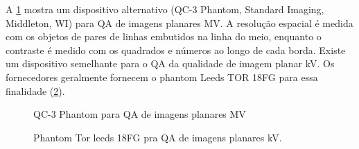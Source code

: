 \documentclass[11pt,a4paper]{article}
\begin{document}
    A \ref{fig:qaImagemPlanarMV} mostra um dispositivo alternativo (QC-3 Phantom, Standard Imaging, Middleton, WI) para QA de imagens planares MV. A resolução espacial é medida com os objetos de pares de linhas embutidos na linha do meio, enquanto o contraste é medido com os quadrados e números ao longo de cada borda. Existe um dispositivo semelhante para o QA da qualidade de imagem planar kV. Os fornecedores geralmente fornecem o phantom Leeds TOR 18FG para essa finalidade (\ref{fig:torleeds}).

    \begin{figure}[h]
        \centering
        \caption{QC-3 Phantom para QA de imagens planares MV}
        \label{fig:qaImagemPlanarMV}
    \end{figure}

    \begin{figure}[h]
        \centering
        \caption{Phantom Tor leeds 18FG pra QA de imagens planares kV.}
        \label{fig:torleeds}
    \end{figure}
\end{document}
